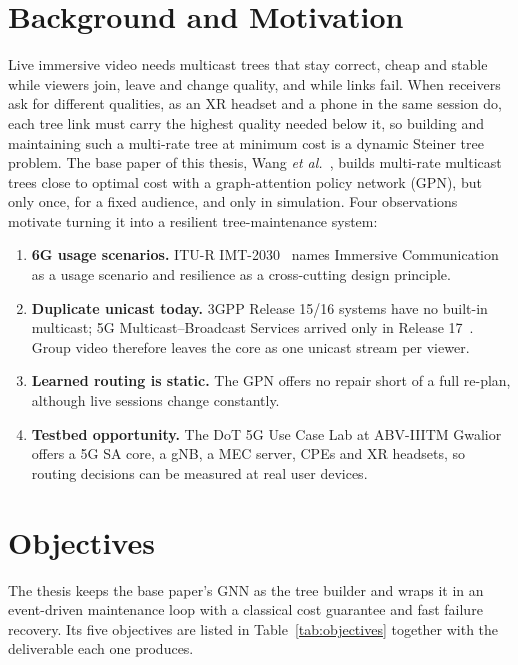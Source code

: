 \section{Background and Motivation}\label{sec:intro_background}
\noindent Live immersive video needs multicast trees that stay correct, cheap and stable while viewers join, leave and change quality, and while links fail. When receivers ask for different qualities, as an XR headset and a phone in the same session do, each tree link must carry the highest quality needed below it, so building and maintaining such a multi-rate tree at minimum cost is a dynamic Steiner tree problem. The base paper of this thesis, Wang \emph{et al.}~\cite{wang2026gnn}, builds multi-rate multicast trees close to optimal cost with a graph-attention policy network (GPN), but only once, for a fixed audience, and only in simulation. Four observations motivate turning it into a resilient tree-maintenance system:
\begin{enumerate}
    \item \textbf{6G usage scenarios.} ITU-R IMT-2030~\cite{itu2023m2160} names Immersive Communication as a usage scenario and resilience as a cross-cutting design principle.
    \item \textbf{Duplicate unicast today.} 3GPP Release 15/16 systems have no built-in multicast; 5G Multicast--Broadcast Services arrived only in Release 17~\cite{3gpp23247}. Group video therefore leaves the core as one unicast stream per viewer.
    \item \textbf{Learned routing is static.} The GPN offers no repair short of a full re-plan, although live sessions change constantly.
    \item \textbf{Testbed opportunity.} The DoT 5G Use Case Lab at ABV-IIITM Gwalior~\cite{dot2026labs} offers a 5G SA core, a gNB, a MEC server, CPEs and XR headsets, so routing decisions can be measured at real user devices.
\end{enumerate}

\section{Objectives}\label{sec:intro_objectives}
\noindent The thesis keeps the base paper's GNN as the tree builder and wraps it in an event-driven maintenance loop with a classical cost guarantee and fast failure recovery. Its five objectives are listed in Table~\ref{tab:objectives} together with the deliverable each one produces.

